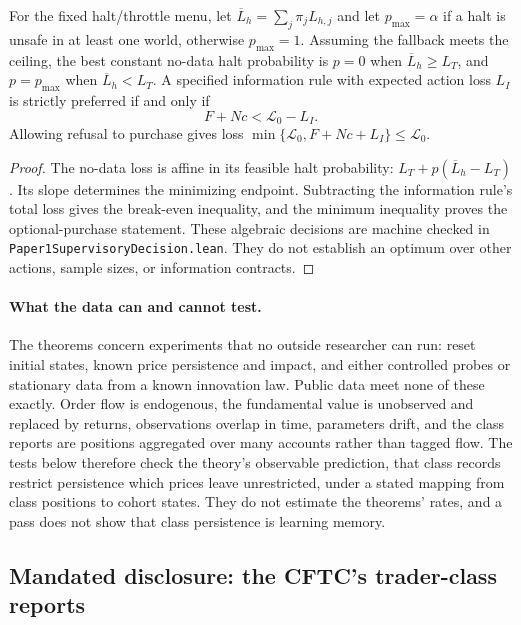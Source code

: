 \begin{proposition}\label{prop:priced_decision}
For the fixed halt/throttle menu, let $\overline L_h=\sum_j\pi_jL_{h,j}$ and let $p_{\max}=\alpha$ if a halt is unsafe in at least one world, otherwise $p_{\max}=1$. Assuming the fallback meets the ceiling, the best constant no-data halt probability is $p=0$ when $\overline L_h\ge L_T$, and $p=p_{\max}$ when $\overline L_h<L_T$. A specified information rule with expected action loss $L_I$ is strictly preferred if and only if
\[
 F+Nc<\mathcal L_0-L_I.
\]
Allowing refusal to purchase gives loss $\min\{\mathcal L_0,F+Nc+L_I\}\le\mathcal L_0$.
\end{proposition}
\begin{proof}
The no-data loss is affine in its feasible halt probability: $L_T+p(\overline L_h-L_T)$. Its slope determines the minimizing endpoint. Subtracting the information rule's total loss gives the break-even inequality, and the minimum inequality proves the optional-purchase statement. These algebraic decisions are machine checked in \nolinkurl{Paper1SupervisoryDecision.lean}. They do not establish an optimum over other actions, sample sizes, or information contracts.
\end{proof}

\paragraph{What the data can and cannot test.} The theorems concern experiments that no outside researcher can run: reset initial states, known price persistence and impact, and either controlled probes or stationary data from a known innovation law. Public data meet none of these exactly. Order flow is endogenous, the fundamental value is unobserved and replaced by returns, observations overlap in time, parameters drift, and the class reports are positions aggregated over many accounts rather than tagged flow. The tests below therefore check the theory's observable prediction, that class records restrict persistence which prices leave unrestricted, under a stated mapping from class positions to cohort states. They do not estimate the theorems' rates, and a pass does not show that class persistence is learning memory.

\subsection{Mandated disclosure: the CFTC's trader-class reports}\label{sec:cot}

